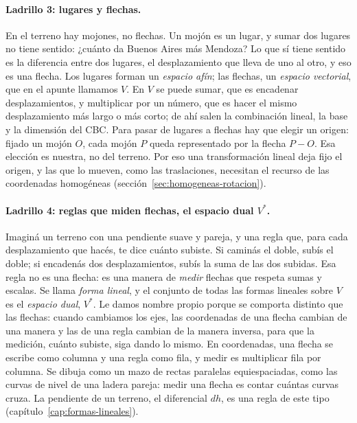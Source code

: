 \paragraph{Ladrillo 3: lugares y flechas.}
En el terreno hay mojones, no flechas. Un mojón es un lugar, y sumar dos lugares no tiene
sentido: ¿cuánto da Buenos Aires más Mendoza? Lo que sí tiene sentido es la diferencia entre
dos lugares, el desplazamiento que lleva de uno al otro, y eso es una flecha. Los lugares forman
un \emph{espacio afín}; las flechas, un \emph{espacio vectorial}, que en el apunte llamamos
\(V\). En \(V\) se puede sumar, que es encadenar desplazamientos, y multiplicar por un número,
que es hacer el mismo desplazamiento más largo o más corto; de ahí salen la combinación
lineal, la base y la dimensión del CBC. Para pasar de lugares a flechas hay que elegir un
origen: fijado un mojón \(O\), cada mojón \(P\) queda representado por la flecha \(P-O\). Esa
elección es nuestra, no del terreno. Por eso una transformación lineal deja fijo el origen, y
las que lo mueven, como las traslaciones, necesitan el recurso de las coordenadas homogéneas
(sección~\ref{sec:homogeneas-rotacion}).

\paragraph{Ladrillo 4: reglas que miden flechas, el espacio dual \(V^{*}\).}
Imaginá un terreno con una pendiente suave y pareja, y una regla que, para cada desplazamiento
que hacés, te dice cuánto subiste. Si caminás el doble, subís el doble; si encadenás dos
desplazamientos, subís la suma de las dos subidas. Esa regla no es una flecha: es una manera de
\emph{medir} flechas que respeta sumas y escalas. Se llama \emph{forma lineal}, y el conjunto
de todas las formas lineales sobre \(V\) es el \emph{espacio dual}, \(V^{*}\). Le damos nombre
propio porque se comporta distinto que las flechas: cuando cambiamos los ejes, las coordenadas
de una flecha cambian de una manera y las de una regla cambian de la manera inversa, para que la
medición, cuánto subiste, siga dando lo mismo. En coordenadas, una flecha se escribe como
columna y una regla como fila, y medir es multiplicar fila por columna. Se dibuja como un mazo
de rectas paralelas equiespaciadas, como las curvas de nivel de una ladera pareja: medir una
flecha es contar cuántas curvas cruza. La pendiente de un terreno, el diferencial \(dh\), es
una regla de este tipo (capítulo~\ref{cap:formas-lineales}).

